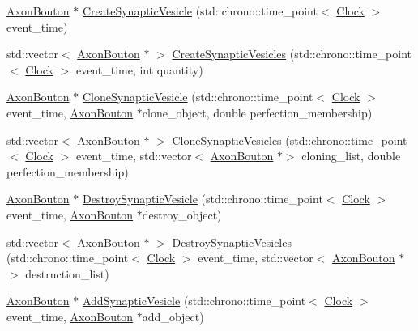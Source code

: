 \begin{DoxyCompactItemize}
\item 
\hyperlink{class_axon_bouton}{Axon\+Bouton} $\ast$ \hyperlink{class_axon_bouton_a2aa0abe381f6e7c87c702189d01dfbf2}{Create\+Synaptic\+Vesicle} (std\+::chrono\+::time\+\_\+point$<$ \hyperlink{universe_8h_a0ef8d951d1ca5ab3cfaf7ab4c7a6fd80}{Clock} $>$ event\+\_\+time)
\item 
std\+::vector$<$ \hyperlink{class_axon_bouton}{Axon\+Bouton} $\ast$ $>$ \hyperlink{class_axon_bouton_a0cabe429536722f14ae800c8579168b7}{Create\+Synaptic\+Vesicles} (std\+::chrono\+::time\+\_\+point$<$ \hyperlink{universe_8h_a0ef8d951d1ca5ab3cfaf7ab4c7a6fd80}{Clock} $>$ event\+\_\+time, int quantity)
\item 
\hyperlink{class_axon_bouton}{Axon\+Bouton} $\ast$ \hyperlink{class_axon_bouton_a0e739b20447539f8db3655e83575fcf4}{Clone\+Synaptic\+Vesicle} (std\+::chrono\+::time\+\_\+point$<$ \hyperlink{universe_8h_a0ef8d951d1ca5ab3cfaf7ab4c7a6fd80}{Clock} $>$ event\+\_\+time, \hyperlink{class_axon_bouton}{Axon\+Bouton} $\ast$clone\+\_\+object, double perfection\+\_\+membership)
\item 
std\+::vector$<$ \hyperlink{class_axon_bouton}{Axon\+Bouton} $\ast$ $>$ \hyperlink{class_axon_bouton_a7bf1d8db3287dc5357d0095233f5c47f}{Clone\+Synaptic\+Vesicles} (std\+::chrono\+::time\+\_\+point$<$ \hyperlink{universe_8h_a0ef8d951d1ca5ab3cfaf7ab4c7a6fd80}{Clock} $>$ event\+\_\+time, std\+::vector$<$ \hyperlink{class_axon_bouton}{Axon\+Bouton} $\ast$$>$ cloning\+\_\+list, double perfection\+\_\+membership)
\item 
\hyperlink{class_axon_bouton}{Axon\+Bouton} $\ast$ \hyperlink{class_axon_bouton_a75592b4ccc589db756183f4aaa694ffe}{Destroy\+Synaptic\+Vesicle} (std\+::chrono\+::time\+\_\+point$<$ \hyperlink{universe_8h_a0ef8d951d1ca5ab3cfaf7ab4c7a6fd80}{Clock} $>$ event\+\_\+time, \hyperlink{class_axon_bouton}{Axon\+Bouton} $\ast$destroy\+\_\+object)
\item 
std\+::vector$<$ \hyperlink{class_axon_bouton}{Axon\+Bouton} $\ast$ $>$ \hyperlink{class_axon_bouton_a0fa1c238a29d9e2b84b4d9c556452150}{Destroy\+Synaptic\+Vesicles} (std\+::chrono\+::time\+\_\+point$<$ \hyperlink{universe_8h_a0ef8d951d1ca5ab3cfaf7ab4c7a6fd80}{Clock} $>$ event\+\_\+time, std\+::vector$<$ \hyperlink{class_axon_bouton}{Axon\+Bouton} $\ast$$>$ destruction\+\_\+list)
\item 
\hyperlink{class_axon_bouton}{Axon\+Bouton} $\ast$ \hyperlink{class_axon_bouton_a3009e5d49c699afa7f633b026b37ed77}{Add\+Synaptic\+Vesicle} (std\+::chrono\+::time\+\_\+point$<$ \hyperlink{universe_8h_a0ef8d951d1ca5ab3cfaf7ab4c7a6fd80}{Clock} $>$ event\+\_\+time, \hyperlink{class_axon_bouton}{Axon\+Bouton} $\ast$add\+\_\+object)

\end{DoxyCompactItemize}
